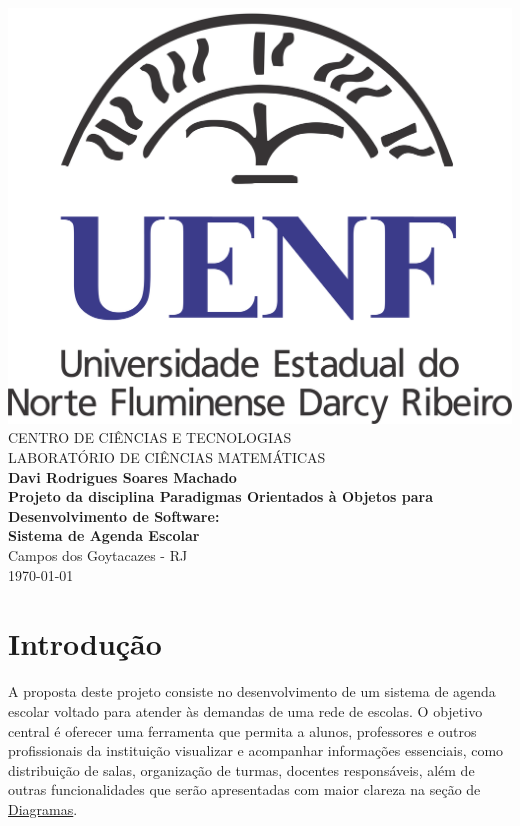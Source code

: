 \documentclass[12pt,a4paper]{report}
\begin{document}
\begin{titlepage}
    \begin{center}
        
        \includegraphics[scale=0.2]{imagens/uenf1.png}\\[1cm]
       
        {\large CENTRO DE CIÊNCIAS E TECNOLOGIAS}\\
        {\large LABORATÓRIO DE CIÊNCIAS MATEMÁTICAS}\\[4cm]

        {\large \textbf{Davi Rodrigues Soares Machado}}\\[4cm]

        {\large \textbf{Projeto da disciplina Paradigmas Orientados à Objetos para Desenvolvimento de Software: \\ Sistema de Agenda Escolar}}\\[4cm]

        Campos dos Goytacazes - RJ\\
        \today
    \end{center}
\end{titlepage}


\tableofcontents
\newpage


\chapter{Introdução}
A proposta deste projeto consiste no desenvolvimento de um sistema de agenda escolar voltado para atender às demandas de uma rede de escolas. O objetivo central é oferecer uma ferramenta que permita a alunos, professores e outros profissionais da instituição visualizar e acompanhar informações essenciais, como distribuição de salas, organização de turmas, docentes responsáveis, além de outras funcionalidades que serão apresentadas com maior clareza na seção de \hyperref[sec:Diagrama]{Diagramas}.
\end{document}

